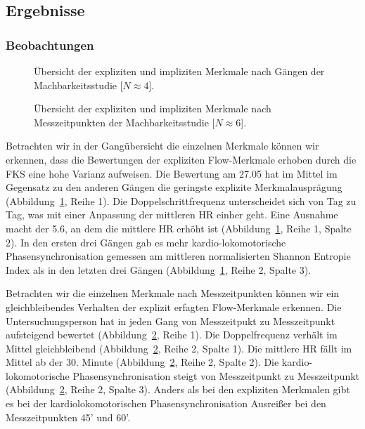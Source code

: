 \subsection{Ergebnisse} 

\label{sub:ergebnisse_5_2}

\subsubsection{Beobachtungen} 

\label{ssub:beobachtungen_5_2} 
\begin{figure}
	[!htb]  \caption[Übersicht der expliziten und impliziten Merkmale nach Gängen der Machbarkeitsstudie.]{Übersicht der expliziten und impliziten Merkmale nach Gängen der Machbarkeitsstudie [$N \approx 4$].} \label{fig:ubersicht_nach_gangen_2} 
\end{figure}
\begin{figure}
	[!htb]  \caption[Übersicht der expliziten und impliziten Merkmale nach Messzeitpunkten der Machbarkeitsstudie.]{Übersicht der expliziten und impliziten Merkmale nach Messzeitpunkten der Machbarkeitsstudie [$N \approx 6$].} \label{fig:ubersicht_nach_messzeitpunkten_2} 
\end{figure}

Betrachten wir in der Gangübersicht die einzelnen Merkmale können wir erkennen, dass die Bewertungen der expliziten Flow-Merkmale erhoben durch die \ac{FKS} eine hohe Varianz aufweisen. Die Bewertung am 27.05 hat im Mittel im Gegensatz zu den anderen Gängen die geringste explizite Merkmalausprägung (Abbildung~\ref{fig:ubersicht_nach_gangen_2}, Reihe 1). Die Doppelschrittfrequenz unterscheidet sich von Tag zu Tag, was mit einer Anpassung der mittleren HR einher geht. Eine Ausnahme macht der 5.6, an dem die mittlere HR erhöht ist (Abbildung~\ref{fig:ubersicht_nach_gangen_2}, Reihe 1, Spalte 2). In den ersten drei Gängen gab es mehr kardio-lokomotorische Phasensynchronisation gemessen am mittleren normalisierten Shannon Entropie Index als in den letzten drei Gängen (Abbildung~\ref{fig:ubersicht_nach_gangen_2}, Reihe 2, Spalte 3).

Betrachten wir die einzelnen Merkmale nach Messzeitpunkten können wir ein gleichbleibendes Verhalten der explizit erfagten Flow-Merkmale erkennen. Die Untersuchungsperson hat in jeden Gang von Messzeitpukt zu Messzeitpunkt aufsteigend bewertet (Abbildung~\ref{fig:ubersicht_nach_messzeitpunkten_2}, Reihe 1). Die Doppelfrequenz verhält im Mittel gleichbleibend (Abbildung~\ref{fig:ubersicht_nach_messzeitpunkten_2}, Reihe 2, Spalte 1). Die mittlere HR fällt im Mittel ab der 30. Minute (Abbildung~\ref{fig:ubersicht_nach_messzeitpunkten_2}, Reihe 2, Spalte 2). Die kardio-lokomotorische Phasensynchronisation steigt von Messzeitpunkt zu Messzeitpunkt (Abbildung~\ref{fig:ubersicht_nach_messzeitpunkten_2}, Reihe 2, Spalte 3). Anders als bei den expliziten Merkmalen gibt es bei der kardiolokomotorischen Phasensynchronisation Ausreißer bei den Messzeitpunkten 45' und 60'. 

